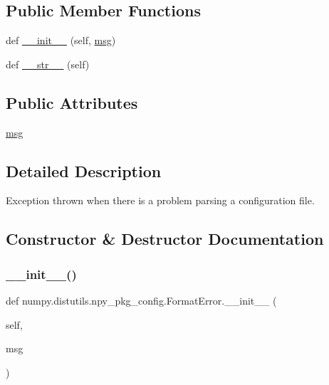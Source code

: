 \subsection*{Public Member Functions}
\begin{DoxyCompactItemize}
\item 
def \hyperlink{classnumpy_1_1distutils_1_1npy__pkg__config_1_1FormatError_add79af4bd180f016c3ea978daa9a9b6f}{\+\_\+\+\_\+init\+\_\+\+\_\+} (self, \hyperlink{classnumpy_1_1distutils_1_1npy__pkg__config_1_1FormatError_a1f2b7f7e3989afede131a2f37e054f68}{msg})
\item 
def \hyperlink{classnumpy_1_1distutils_1_1npy__pkg__config_1_1FormatError_a7513fa992f699e317b2eefc9f2483411}{\+\_\+\+\_\+str\+\_\+\+\_\+} (self)
\end{DoxyCompactItemize}
\subsection*{Public Attributes}
\begin{DoxyCompactItemize}
\item 
\hyperlink{classnumpy_1_1distutils_1_1npy__pkg__config_1_1FormatError_a1f2b7f7e3989afede131a2f37e054f68}{msg}
\end{DoxyCompactItemize}


\subsection{Detailed Description}
\begin{DoxyVerb}Exception thrown when there is a problem parsing a configuration file.\end{DoxyVerb}
 

\subsection{Constructor \& Destructor Documentation}
\mbox{\label{classnumpy_1_1distutils_1_1npy__pkg__config_1_1FormatError_add79af4bd180f016c3ea978daa9a9b6f}} 
\subsubsection{\texorpdfstring{\+\_\+\+\_\+init\+\_\+\+\_\+()}{\_\_init\_\_()}}
{\footnotesize\ttfamily def numpy.\+distutils.\+npy\+\_\+pkg\+\_\+config.\+Format\+Error.\+\_\+\+\_\+init\+\_\+\+\_\+ (\begin{DoxyParamCaption}\item[{}]{self,  }\item[{}]{msg }\end{DoxyParamCaption})}



